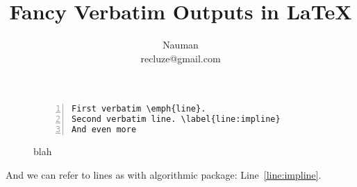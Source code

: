\documentclass{article}
\begin{document}
\title{Fancy Verbatim Outputs in \LaTeX}
\author{Nauman \\ recluze@gmail.com}
\maketitle

\begin{figure*}
\begin{Verbatim}[frame=single,label=Sample Label,numbers=left,commandchars=\\\{\}]
First verbatim \emph{line}. 
Second verbatim line. \label{line:impline}
And even more
\end{Verbatim}
\caption{blah}
\end{figure*}

And we can refer to lines as with algorithmic package: Line~\ref{line:impline}.
\end{document}
